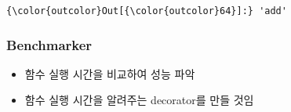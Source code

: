 \documentclass[11pt]{article}
\providecommand{\tightlist}{%
      \setlength{\itemsep}{0pt}\setlength{\parskip}{0pt}}
\begin{document}
\begin{Verbatim}[commandchars=\\\{\}]
{\color{outcolor}Out[{\color{outcolor}64}]:} 'add'
\end{Verbatim}
            
    \subsubsection{Benchmarker}\label{benchmarker}

\begin{itemize}
\tightlist
\item
  함수 실행 시간을 비교하여 성능 파악
\item
  함수 실행 시간을 알려주는 decorator를 만들 것임
\end{itemize}
\end{document}
